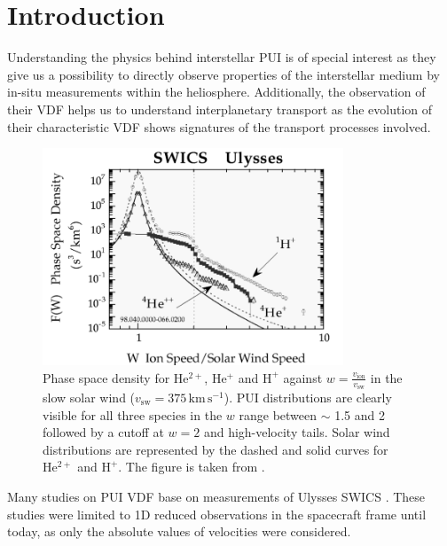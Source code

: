 
\chapter{Introduction} %

\label{chap:intro} %



Understanding the physics behind interstellar PUI is of special interest as they give us a possibility to directly observe properties of the interstellar medium by in-situ measurements within the heliosphere. 
Additionally, the observation of their VDF helps us to understand interplanetary transport as the evolution of their characteristic VDF shows signatures of the transport processes involved.
\begin{figure}[h]
	\includegraphics[width=0.8\textwidth]{Figures/sw_pui_gloeckler.png}
	\centering
	\caption{Phase space density for $\mathrm{He^{2+}}$, $\mathrm{He^{+}}$ and $\mathrm{H^{+}}$ against $w = \frac{v_\mathrm{ion}}{v_\mathrm{sw}}$ in the slow solar wind ($v_\mathrm{sw} = 375\,\mathrm{km\,s^{-1}}$). PUI distributions are clearly visible for all three species in the $w$ range between $\sim$ 1.5 and 2 followed by a cutoff at $w = 2$ and high-velocity tails. Solar wind distributions are represented by the dashed and solid curves for $\mathrm{He^{2+}}$ and $\mathrm{H^{+}}$. The figure is taken from \citet{gloeckler1999}.} 
	\label{fig:gloeckler}
\end{figure}
Many studies on PUI VDF base on measurements of Ulysses SWICS \citep{gloeckler_geiss}.
These studies were limited to 1D reduced observations in the spacecraft frame until today, as only the absolute values of velocities were considered.
